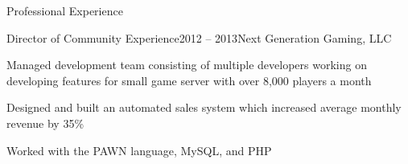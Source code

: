 \documentclass{resume} %
\begin{document}
\begin{rSection}{Professional Experience}

\begin{rSubsection}{Director of Community Experience}{2012 -- 2013}{Next Generation Gaming, LLC}{}
\item Managed development team consisting of multiple developers working on developing features for small game server with over 8,000 players a month
\item Designed and built an automated sales system which increased average monthly revenue by 35\%
\item Worked with the PAWN language, MySQL, and PHP
\end{rSubsection}

\end{rSection}

\end{document}
